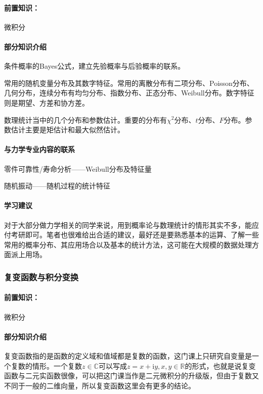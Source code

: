 \paragraph{前置知识：}微积分

\paragraph{部分知识介绍}

条件概率的Bayes公式，建立先验概率与后验概率的联系。

常用的随机变量分布及其数字特征。常用的离散分布有二项分布、Poisson分布、几何分布，连续分布有均匀分布、指数分布、正态分布、Weibull分布。数字特征则是期望、方差和协方差。

数理统计当中的几个分布和参数估计。重要的分布有$\chi^2$分布、$t$分布、$F$分布。参数估计主要是矩估计和最大似然估计。

\paragraph{与力学专业内容的联系}

零件可靠性/寿命分析——Weibull分布及特征量

随机振动——随机过程的统计特征

\paragraph{学习建议}

对于大部分做力学相关的同学来说，用到概率论与数理统计的情形其实不多，能应付考研即可。笔者也很难给出合适的建议，最好还是要熟悉基本的运算、了解一些常用的概率分布、其应用场合以及基本的统计方法，这可能在大规模的数据处理方面派上用场。

\subsubsection{复变函数与积分变换}

\paragraph{前置知识：}微积分

\paragraph{部分知识介绍}

复变函数指的是函数的定义域和值域都是复数的函数，这门课上只研究自变量是一个复数的情形。一个复数$z\in\mathbb{C}$可以写成$z=x+\mathrm{i}y, x,y\in\mathbb{R}$的形式，也就是说复变函数与二元实函数很像，可以把这门课当作是二元微积分的升级版，但由于复数又不同于一般的二维向量，所以复变函数这里会有更多的结论。

